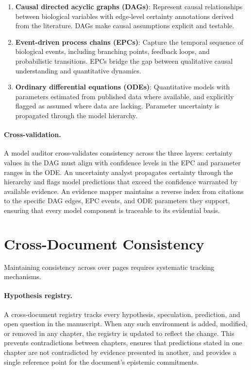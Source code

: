 \begin{enumerate}
\item \textbf{Causal directed acyclic graphs (DAGs)}: Represent causal relationships between biological variables with edge-level certainty annotations derived from the literature. DAGs make causal assumptions explicit and testable.
\item \textbf{Event-driven process chains (EPCs)}: Capture the temporal sequence of biological events, including branching points, feedback loops, and probabilistic transitions. EPCs bridge the gap between qualitative causal understanding and quantitative dynamics.
\item \textbf{Ordinary differential equations (ODEs)}: Quantitative models with parameters estimated from published data where available, and explicitly flagged as assumed where data are lacking. Parameter uncertainty is propagated through the model hierarchy.
\end{enumerate}

\paragraph{Cross-validation.}
A model auditor cross-validates consistency across the three layers: certainty values in the DAG must align with confidence levels in the EPC and parameter ranges in the ODE. An uncertainty analyst propagates certainty through the hierarchy and flags model predictions that exceed the confidence warranted by available evidence. An evidence mapper maintains a reverse index from citations to the specific DAG edges, EPC events, and ODE parameters they support, ensuring that every model component is traceable to its evidential basis.

\section*{Cross-Document Consistency}
\label{sec:meth-consistency}

Maintaining consistency across over \RoundedPageCount{} pages requires systematic tracking mechanisms.

\paragraph{Hypothesis registry.}
A cross-document registry tracks every hypothesis, speculation, prediction, and open question in the manuscript. When any such environment is added, modified, or removed in any chapter, the registry is updated to reflect the change. This prevents contradictions between chapters, ensures that predictions stated in one chapter are not contradicted by evidence presented in another, and provides a single reference point for the document's epistemic commitments.

